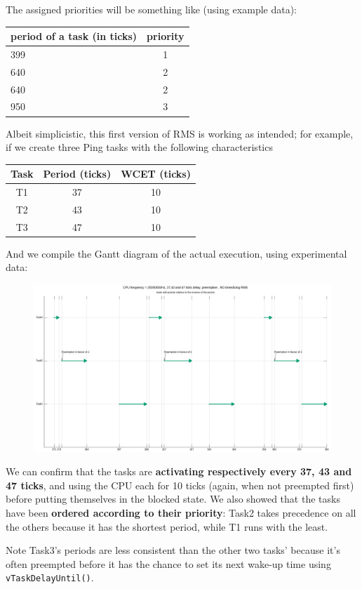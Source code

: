 \documentclass[10pt]{article}
\begin{document}
The assigned priorities will be something like (using example data):
\begin{center}
\begin{tabular}{|l|c|}
\hline 
period of a task (in ticks) & priority \\ 
\hline 
399 & 1 \\ 
\hline 
640 & 2 \\ 
\hline 
640 & 2 \\
\hline 
950 & 3 \\ 
\hline 
\end{tabular} 
\end{center}
Albeit simplicistic, this first version of RMS is working as intended; for example, if we create three Ping tasks with the following characteristics
\\
\begin{center}
\begin{tabular}{|c|c|c|}
\hline 
Task & Period (ticks) & WCET (ticks) \\ 
\hline 
T1 & 37 & 10\\ 
\hline 
T2 &  43 & 10\\ 
\hline 
T3 & 47 & 10\\ 
\hline 
\end{tabular} 
\end{center}
And we compile the Gantt diagram of the actual execution, using experimental data:
\begin{figure}[H]
    \centering
    \includegraphics[width=1.0\linewidth]{Pictures/RMSgantt.png}
    \caption{}
    \label{fig:10}
\end{figure}
We can confirm that the tasks are \textbf{activating respectively every 37, 43 and 47 ticks}, and using the CPU each for 10 ticks (again, when not preempted first) before putting themselves in the blocked state.
We also showed that the tasks have been \textbf{ordered according to their priority}: Task2 takes precedence on all the others because it has the shortest period, while T1 runs with the least. \begin{example}{Note}
Task3's periods are less consistent than the other two tasks' because it's often preempted before it has the chance to set its next wake-up time using \verb|vTaskDelayUntil()|.
\end{example}
\end{document}
